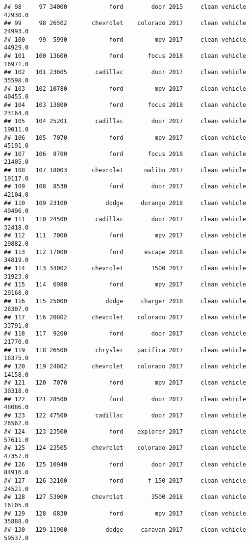 \documentclass[
]{article}
\begin{document}
\begin{verbatim}
## 98     97 34000            ford        door 2015     clean vehicle   42930.0
## 99     98 26502       chevrolet    colorado 2017     clean vehicle   24993.0
## 100    99  5990            ford         mpv 2017     clean vehicle   44929.0
## 101   100 13600            ford       focus 2018     clean vehicle   16971.0
## 102   101 23605        cadillac        door 2017     clean vehicle   35598.0
## 103   102 10780            ford         mpv 2017     clean vehicle   40455.0
## 104   103 13800            ford       focus 2018     clean vehicle   23164.0
## 105   104 25201        cadillac        door 2017     clean vehicle   19011.0
## 106   105  7070            ford         mpv 2017     clean vehicle   45191.0
## 107   106  8700            ford       focus 2018     clean vehicle   21405.0
## 108   107 18003       chevrolet      malibu 2017     clean vehicle   19117.0
## 109   108  8530            ford        door 2017     clean vehicle   42104.0
## 110   109 23100           dodge     durango 2018     clean vehicle   49496.0
## 111   110 24500        cadillac        door 2017     clean vehicle   32418.0
## 112   111  7000            ford         mpv 2017     clean vehicle   29882.0
## 113   112 17000            ford      escape 2018     clean vehicle   34819.0
## 114   113 34002       chevrolet        1500 2017     clean vehicle   31923.0
## 115   114  6980            ford         mpv 2017     clean vehicle   29168.0
## 116   115 25000           dodge     charger 2018     clean vehicle   28307.0
## 117   116 20802       chevrolet    colorado 2017     clean vehicle   33791.0
## 118   117  9200            ford        door 2017     clean vehicle   21770.0
## 119   118 26500        chrysler    pacifica 2017     clean vehicle   18375.0
## 120   119 24802       chevrolet    colorado 2017     clean vehicle   14158.0
## 121   120  7070            ford         mpv 2017     clean vehicle   30318.0
## 122   121 28500            ford        door 2017     clean vehicle   48086.0
## 123   122 47500        cadillac        door 2017     clean vehicle   26562.0
## 124   123 23500            ford    explorer 2017     clean vehicle   57611.0
## 125   124 23505       chevrolet    colorado 2017     clean vehicle   47357.0
## 126   125 10940            ford        door 2017     clean vehicle   84916.0
## 127   126 32100            ford       f-150 2017     clean vehicle   24521.0
## 128   127 53000       chevrolet        3500 2018     clean vehicle   16105.0
## 129   128  6830            ford         mpv 2017     clean vehicle   35888.0
## 130   129 11900           dodge     caravan 2017     clean vehicle   59537.0

\end{verbatim}
\end{document}
